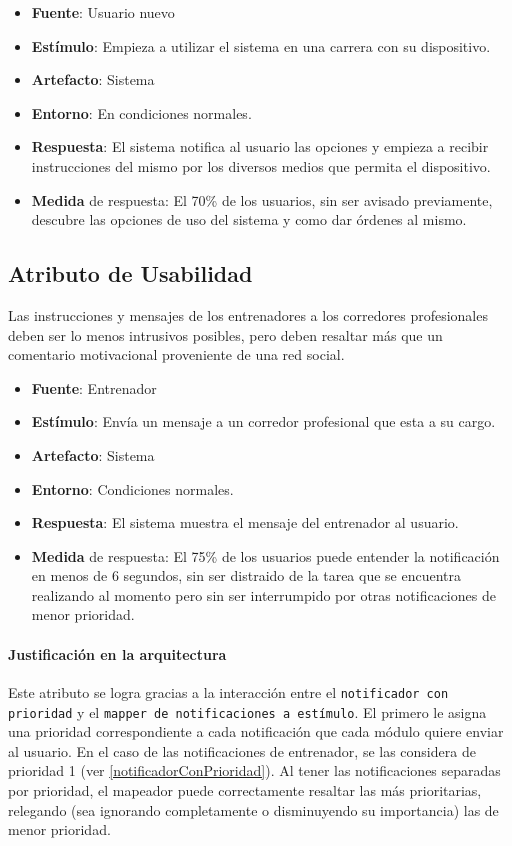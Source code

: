 \begin{itemize}
  \item \textbf{Fuente}: Usuario nuevo
  \item \textbf{Estímulo}: Empieza a utilizar el sistema en una carrera con su dispositivo.
  \item \textbf{Artefacto}: Sistema
  \item \textbf{Entorno}: En condiciones normales.
  \item \textbf{Respuesta}: El sistema notifica al usuario las opciones y empieza a recibir instrucciones del mismo por los diversos medios que permita el dispositivo.
  \item \textbf{Medida} de respuesta: El 70\% de los usuarios, sin ser avisado previamente, descubre las opciones de uso del sistema y como dar órdenes al mismo.
\end{itemize}


\subsection{Atributo de Usabilidad}
Las instrucciones y mensajes de los entrenadores a los corredores profesionales deben ser lo menos intrusivos posibles, pero deben resaltar más que un comentario motivacional proveniente de una red social.

\begin{itemize}
  \item \textbf{Fuente}: Entrenador
  \item \textbf{Estímulo}: Envía un mensaje a un corredor profesional que esta a su cargo.
  \item \textbf{Artefacto}: Sistema
  \item \textbf{Entorno}: Condiciones normales.
  \item \textbf{Respuesta}: El sistema muestra el mensaje del entrenador al usuario.
  \item \textbf{Medida} de respuesta: El 75\% de los usuarios puede entender la notificación en menos de 6 segundos, sin ser distraido de la tarea que se encuentra realizando al momento pero sin ser interrumpido por otras notificaciones de menor prioridad.
\end{itemize}

\paragraph{Justificación en la arquitectura}
Este atributo se logra gracias a la interacción entre el \texttt{notificador con prioridad} y el \texttt{mapper de notificaciones a estímulo}. El primero le asigna una prioridad correspondiente a cada notificación que cada módulo quiere enviar al usuario. En el caso de las notificaciones de entrenador, se las considera de prioridad 1 (ver \ref{notificadorConPrioridad}). Al tener las notificaciones separadas por prioridad, el mapeador puede correctamente resaltar las más prioritarias, relegando (sea ignorando completamente o disminuyendo su importancia) las de menor prioridad.

